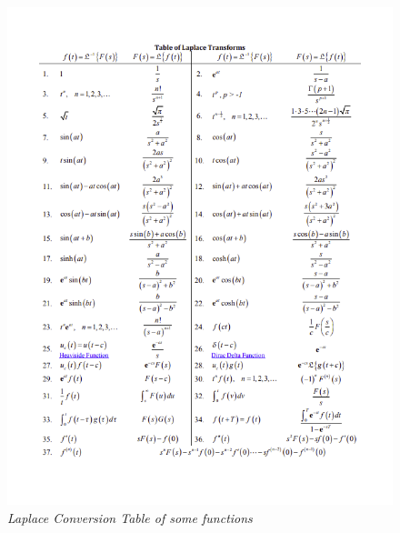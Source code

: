             
	\begin{figure}[H]
	\centering
	\includegraphics[width=15cm]{Appendix/Laplace-Table.png}
    \caption{\textit{Laplace Conversion Table of some functions}}
    \label{}
	\end{figure}



